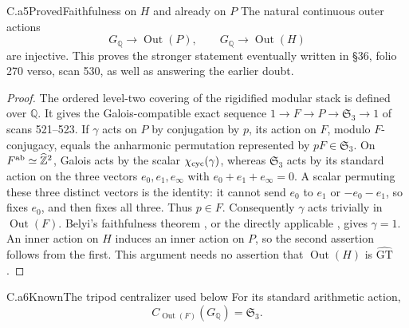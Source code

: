 \begin{claim}{C.a5}{Proved}{Faithfulness on $H$ and already on $P$}
The natural continuous outer actions
\[
 G_{\mathbb Q}\longrightarrow\operatorname{Out}(P),\qquad
 G_{\mathbb Q}\longrightarrow\operatorname{Out}(H)
\]
are injective. This proves the stronger statement eventually written in
\S36, folio 270 verso, scan 530, as well as answering the earlier doubt.
\end{claim}
\begin{proof}
The ordered level-two covering of the rigidified modular stack is defined
over $\mathbb Q$. It gives the Galois-compatible exact sequence
$1\to F\to P\to\mathfrak S_3\to1$ of scans 521--523. If
$\gamma$ acts on $P$ by conjugation by $p$, its action on $F$, modulo
$F$-conjugacy, equals the anharmonic permutation represented by
$pF\in\mathfrak S_3$. On $F^{\rm ab}\simeq\widehat{\mathbb Z}^2$,
Galois acts by the scalar $\chi_{\rm cyc}(\gamma)$, whereas
$\mathfrak S_3$ acts by its standard action on the three vectors
$e_0,e_1,e_\infty$ with $e_0+e_1+e_\infty=0$. A scalar permuting these
three distinct vectors is the identity: it cannot send $e_0$ to $e_1$
or $-e_0-e_1$, so fixes $e_0$, and then fixes all three. Thus $p\in F$.
Consequently $\gamma$ acts trivially in $\operatorname{Out}(F)$.
Belyi's faithfulness theorem
\citep[Theorem 4 and its Corollary]{Belyi1980arith}, or the directly
applicable \citet[Corollary 6.3(i)]{HM2011arith}, gives $\gamma=1$.
An inner action on $H$ induces an inner action on $P$, so the second
assertion follows from the first. This argument needs no assertion that
$\operatorname{Out}(H)$ is $\widehat{\mathrm{GT}}$.
\end{proof}

\begin{claim}{C.a6}{Known}{The tripod centralizer used below}
For its standard arithmetic action,
\[
 C_{\operatorname{Out}(F)}(G_{\mathbb Q})=\mathfrak S_3.
\]
\end{claim}

